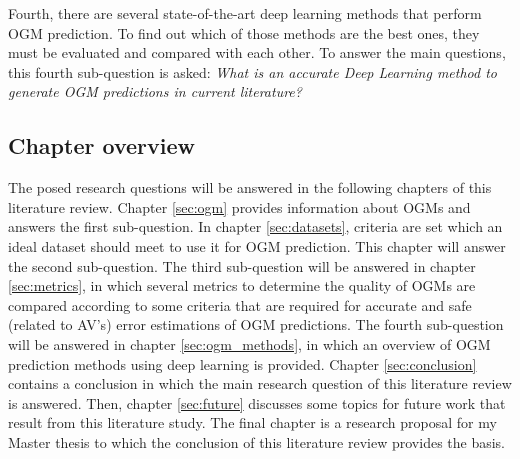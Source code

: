 Fourth, there are several state-of-the-art deep learning methods that perform \gls{OGM} prediction. To find out which of those methods are the best ones, they must be evaluated and compared with each other. To answer the main questions, this fourth sub-question is asked: \textit{What is an accurate Deep Learning method to generate \gls{OGM} predictions in current literature?}

\subsection{Chapter overview}
The posed research questions will be answered in the following chapters of this literature review. Chapter \ref{sec:ogm} provides information about \glspl{OGM} and answers the first sub-question. In chapter \ref{sec:datasets}, criteria are set which an ideal dataset should meet to use it for \gls{OGM} prediction. This chapter will answer the second sub-question. The third sub-question will be answered in chapter \ref{sec:metrics}, in which several metrics to determine the quality of \glspl{OGM} are compared according to some criteria that are required for accurate and safe (related to \gls{AV}'s) error estimations of \gls{OGM} predictions. The fourth sub-question will be answered in chapter \ref{sec:ogm_methods}, in which an overview of \gls{OGM} prediction methods using deep learning is provided. Chapter \ref{sec:conclusion} contains a conclusion in which the main research question of this literature review is answered. Then, chapter \ref{sec:future} discusses some topics for future work that result from this literature study. The final chapter is a research proposal for my Master thesis to which the conclusion of this literature review provides the basis.








